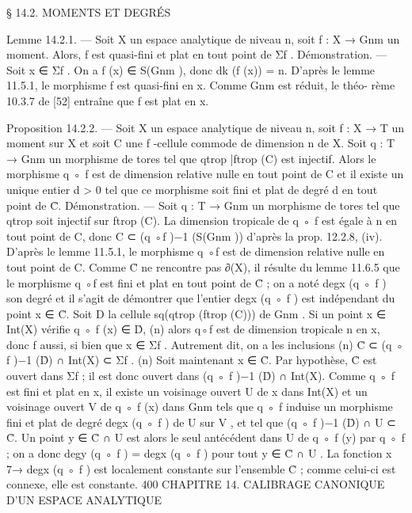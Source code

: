 \documentclass[
  10pt,
]{article}
\newenvironment{Shaded}{}{}
\newcommand{\NormalTok}[1]{#1}
\begin{document}
\begin{Shaded}
\begin{Highlighting}[]
\NormalTok{                           § 14.2. MOMENTS ET DEGRÉS}

\NormalTok{Lemme 14.2.1. — Soit X un espace analytique de niveau n, soit f : X → Gnm un}
\NormalTok{moment. Alors, f est quasi{-}fini et plat en tout point de Σf .}
\NormalTok{Démonstration. — Soit x ∈ Σf . On a f (x) ∈ S(Gnm ), donc dk (f (x)) = n. D’après}
\NormalTok{le lemme 11.5.1, le morphisme f est quasi{-}fini en x. Comme Gnm est réduit, le théo{-}}
\NormalTok{rème 10.3.7 de [52] entraîne que f est plat en x.}

\NormalTok{Proposition 14.2.2. — Soit X un espace analytique de niveau n, soit f : X → T un}
\NormalTok{moment sur X et soit C une f {-}cellule commode de dimension n de X. Soit q : T → Gnm}
\NormalTok{un morphisme de tores tel que qtrop |ftrop (C) est injectif. Alors le morphisme q ◦ f est de}
\NormalTok{dimension relative nulle en tout point de C et il existe un unique entier d \textgreater{} 0 tel que ce}
\NormalTok{morphisme soit fini et plat de degré d en tout point de C̊.}
\NormalTok{Démonstration. — Soit q : T → Gnm un morphisme de tores tel que qtrop soit injectif sur}
\NormalTok{ftrop (C). La dimension tropicale de q ◦ f est égale à n en tout point de C, donc C ⊂}
\NormalTok{(q ◦f )−1 (S(Gnm )) d’après la prop. 12.2.8, (iv). D’après le lemme 11.5.1, le morphisme q ◦f}
\NormalTok{est de dimension relative nulle en tout point de C.}
\NormalTok{   Comme C̊ ne rencontre pas ∂(X), il résulte du lemme 11.6.5 que le morphisme q ◦f est}
\NormalTok{fini et plat en tout point de C̊ ; on a noté degx (q ◦ f ) son degré et il s’agit de démontrer}
\NormalTok{que l’entier degx (q ◦ f ) est indépendant du point x ∈ C̊.}
\NormalTok{   Soit D la cellule sq(qtrop (ftrop (C))) de Gnm . Si un point x ∈ Int(X) vérifie q ◦ f (x) ∈ D̊,}
\NormalTok{                                                                                 (n)}
\NormalTok{alors q◦f est de dimension tropicale n en x, donc f aussi, si bien que x ∈ Σf . Autrement}
\NormalTok{dit, on a les inclusions}
\NormalTok{                                                                (n)}
\NormalTok{                             C̊ ⊂ (q ◦ f )−1 (D̊) ∩ Int(X) ⊂ Σf .}
\NormalTok{                                                                        (n)}
\NormalTok{   Soit maintenant x ∈ C̊. Par hypothèse, C̊ est ouvert dans Σf ; il est donc ouvert}
\NormalTok{dans (q ◦ f )−1 (D̊) ∩ Int(X). Comme q ◦ f est fini et plat en x, il existe un voisinage}
\NormalTok{ouvert U de x dans Int(X) et un voisinage ouvert V de q ◦ f (x) dans Gnm tels que}
\NormalTok{q ◦ f induise un morphisme fini et plat de degré degx (q ◦ f ) de U sur V , et tel que}
\NormalTok{(q ◦ f )−1 (D̊) ∩ U ⊂ C̊. Un point y ∈ C̊ ∩ U est alors le seul antécédent dans U de}
\NormalTok{q ◦ f (y) par q ◦ f ; on a donc degy (q ◦ f ) = degx (q ◦ f ) pour tout y ∈ C̊ ∩ U . La}
\NormalTok{fonction x 7→ degx (q ◦ f ) est localement constante sur l’ensemble C̊ ; comme celui{-}ci est}
\NormalTok{connexe, elle est constante.}
\NormalTok{400           CHAPITRE 14. CALIBRAGE CANONIQUE D’UN ESPACE ANALYTIQUE}


\end{Highlighting}
\end{Shaded}
\end{document}
